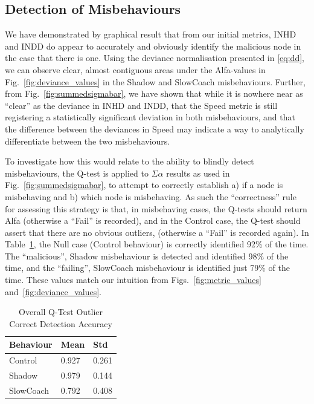 \documentclass[conference,compsoc,letterpaper]{IEEEtran}
\begin{document}
\subsection{Detection of Misbehaviours}
We have demonstrated by graphical result that from our initial metrics, INHD and INDD do appear to accurately and obviously identify the malicious node in the case that there is one. 
Using the deviance normalisation presented in \eqref{eq:dd}, we can observe clear, almost contiguous areas under the Alfa-values in Fig.~\ref{fig:deviance_values} in the Shadow and SlowCoach misbehaviours.
Further, from Fig.~\ref{fig:summedsigmabar}, we have shown that while it is nowhere near as ``clear'' as the deviance in INHD and INDD, that the Speed metric is still registering a statistically significant deviation in both misbehaviours, and that the difference between the deviances in Speed may indicate a way to analytically differentiate between the two misbehaviours.

To investigate how this would relate to the ability to blindly detect misbehaviours, the Q-test is applied to $\Sigma\alpha$ results as used in Fig.~\ref{fig:summedsigmabar}, to attempt to correctly establish a) if a node is misbehaving and b) which node is misbehaving. 
As such the ``correctness'' rule for assessing this strategy is that, in misbehaving cases, the Q-tests should return Alfa (otherwise a ``Fail'' is recorded), and in the Control case, the Q-test should assert that there are no obvious outliers, (otherwise a ``Fail'' is recorded again).
In Table~\ref{tab:overall_stats}, the Null case (Control behaviour) is correctly identified 92\% of the time.
The ``malicious'', Shadow misbehaviour is detected and identified 98\% of the time, and the ``failing'', SlowCoach misbehaviour is identified just 79\% of the time. 
These values match our intuition from Figs.~\ref{fig:metric_values} and~\ref{fig:deviance_values}.

\begin{table}
  \caption{Overall Q-Test Outlier Correct Detection Accuracy}
  \centering
\begin{tabular}{lll}
\toprule
Behaviour &  Mean &   Std \\
\midrule
Control   & 0.927 & 0.261 \\
Shadow    & 0.979 & 0.144 \\
SlowCoach & 0.792 & 0.408 \\
\bottomrule
\end{tabular}
  \label{tab:overall_stats}
\end{table}
\end{document}
